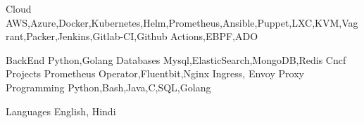 

\begin{cvskills}

  \cvskill
    {Cloud} %
	{AWS,Azure,Docker,Kubernetes,Helm,Prometheus,Ansible,Puppet,LXC,KVM,Vagrant,Packer,Jenkins,Gitlab-CI,Github Actions,EBPF,ADO} %

  \cvskill
   {BackEnd} %
	{Python,Golang} %
  \cvskill
   {Databases} %
	{Mysql,ElasticSearch,MongoDB,Redis} %
\cvskill
{Cncf Projects} %
{Prometheus Operator,Fluentbit,Nginx Ingress, Envoy Proxy} %
  \cvskill
   {Programming} %
	{Python,Bash,Java,C,SQL,Golang} %

  \cvskill
    {Languages} %
	{English, Hindi} %

\end{cvskills}
